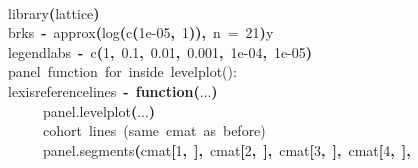 \documentclass[a4paper]{article}
\newcommand{\hlnumber}[1]{\textcolor[rgb]{0.0823529411764706,0.0784313725490196,0.709803921568627}{#1}}%
\newcommand{\hlfunctioncall}[1]{\textcolor[rgb]{1,0,0}{#1}}%
\newcommand{\hlkeyword}[1]{\textcolor[rgb]{0,0,0}{\textbf{#1}}}%
\newcommand{\hlargument}[1]{\textcolor[rgb]{0.694117647058824,0.247058823529412,0.0196078431372549}{#1}}%
\newcommand{\hlcomment}[1]{\textcolor[rgb]{0.8,0.8,0.8}{#1}}%
\newcommand{\hlformalargs}[1]{\textcolor[rgb]{0.0705882352941176,0.713725490196078,0.0705882352941176}{#1}}%
\newcommand{\hlassignement}[1]{\textcolor[rgb]{0.215686274509804,0.215686274509804,0.384313725490196}{\textbf{#1}}}%
\newcommand{\hlsymbol}[1]{\textcolor[rgb]{0,0,0}{#1}}%
\newcommand{\hlprompt}[1]{\textcolor[rgb]{0,0,0}{#1}}%
\newcommand{\hlstd}[1]{\textcolor[rgb]{0,0,0}{#1}}%
\newenvironment{Houtput}{\raggedright}{%
%
}
\begin{document}
\begin{Houtput}
\hspace*{\fill}\\
\hlstd{}\ttfamily\noindent
\hlprompt{\usebox{\hlnormalsizeboxgreaterthan}{\ }}\hlfunctioncall{library}\hlkeyword{(}\hlsymbol{lattice}\hlkeyword{)}\mbox{}
\normalfont
\hspace*{\fill}\\
\hlstd{}\ttfamily\noindent
\hlprompt{\usebox{\hlnormalsizeboxgreaterthan}{\ }}\hlsymbol{brks}{\ }\hlassignement{\usebox{\hlnormalsizeboxlessthan}-}{\ }\hlfunctioncall{approx}\hlkeyword{(}\hlfunctioncall{log}\hlkeyword{(}\hlfunctioncall{c}\hlkeyword{(}\hlnumber{1e-05}\hlkeyword{,}{\ }\hlnumber{1}\hlkeyword{)}\hlkeyword{)}\hlkeyword{,}{\ }\hlargument{n}{\ }\hlargument{=}{\ }\hlnumber{21}\hlkeyword{)}\hlkeyword{\usebox{\hlnormalsizeboxdollar}}\hlsymbol{y}\mbox{}
\normalfont
\hspace*{\fill}\\
\hlstd{}\ttfamily\noindent
\hlprompt{\usebox{\hlnormalsizeboxgreaterthan}{\ }}\hlsymbol{legendlabs}{\ }\hlassignement{\usebox{\hlnormalsizeboxlessthan}-}{\ }\hlfunctioncall{c}\hlkeyword{(}\hlnumber{1}\hlkeyword{,}{\ }\hlnumber{0.1}\hlkeyword{,}{\ }\hlnumber{0.01}\hlkeyword{,}{\ }\hlnumber{0.001}\hlkeyword{,}{\ }\hlnumber{1e-04}\hlkeyword{,}{\ }\hlnumber{1e-05}\hlkeyword{)}\mbox{}
\normalfont
\hspace*{\fill}\\
\hlstd{}\ttfamily\noindent
\hlprompt{\usebox{\hlnormalsizeboxgreaterthan}{\ }}\hlcomment{\usebox{\hlnormalsizeboxhash}{\ }panel{\ }function{\ }for{\ }inside{\ }levelplot():}\mbox{}
\normalfont
\hspace*{\fill}\\
\hlstd{}\ttfamily\noindent
\hlprompt{\usebox{\hlnormalsizeboxgreaterthan}{\ }}\hlsymbol{lexisreferencelines}{\ }\hlassignement{\usebox{\hlnormalsizeboxlessthan}-}{\ }\hlkeyword{function}\hlkeyword{(}\hlformalargs{...}\hlkeyword{)}{\ }\hlkeyword{\usebox{\hlnormalsizeboxopenbrace}}\hspace*{\fill}\\
\hlstd{}\hlprompt{{\ }}{\ }{\ }{\ }{\ }\hlfunctioncall{panel.levelplot}\hlkeyword{(}\hlsymbol{...}\hlkeyword{)}\hspace*{\fill}\\
\hlstd{}\hlprompt{{\ }}{\ }{\ }{\ }{\ }\hlcomment{\usebox{\hlnormalsizeboxhash}{\ }cohort{\ }lines{\ }(same{\ }cmat{\ }as{\ }before)}\hspace*{\fill}\\
\hlstd{}\hlprompt{{\ }}{\ }{\ }{\ }{\ }\hlfunctioncall{panel.segments}\hlkeyword{(}\hlsymbol{cmat}\hlkeyword{[}\hlnumber{1}\hlkeyword{,}{\ }\hlkeyword{]}\hlkeyword{,}{\ }\hlsymbol{cmat}\hlkeyword{[}\hlnumber{2}\hlkeyword{,}{\ }\hlkeyword{]}\hlkeyword{,}{\ }\hlsymbol{cmat}\hlkeyword{[}\hlnumber{3}\hlkeyword{,}{\ }\hlkeyword{]}\hlkeyword{,}{\ }\hlsymbol{cmat}\hlkeyword{[}\hlnumber{4}\hlkeyword{,}{\ }\hlkeyword{]}\hlkeyword{,}\hspace*{\fill}\\

\end{Houtput}
\end{document}
